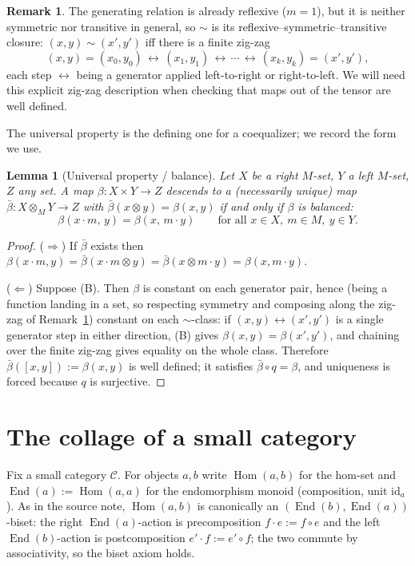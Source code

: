 \documentclass[11pt]{article}
\newtheorem{lemma}[theorem]{Lemma}
\theoremstyle{definition}
\newtheorem{remark}[theorem]{Remark}
\newcommand{\Hom}{\operatorname{Hom}}
\newcommand{\End}{\operatorname{End}}
\newcommand{\id}{\mathrm{id}}
\newcommand{\C}{\mathcal{C}}
\begin{document}
\begin{remark}\label{rem:relation}
The generating relation is already reflexive ($m=1$), but it is neither
symmetric nor transitive in general, so $\sim$ is its
reflexive--symmetric--transitive closure: $(x,y)\sim(x',y')$ iff there is a
finite zig-zag
\[
  (x,y) = (x_0,y_0) \,\leftrightarrow\, (x_1,y_1)
  \,\leftrightarrow\, \cdots \,\leftrightarrow\, (x_k,y_k) = (x',y'),
\]
each step $\leftrightarrow$ being a generator applied left-to-right or
right-to-left. We will need this explicit zig-zag description when checking
that maps out of the tensor are well defined.
\end{remark}

The universal property is the defining one for a coequalizer; we record the
form we use.

\begin{lemma}[Universal property / balance]\label{lem:up}
Let $X$ be a right $M$-set, $Y$ a left $M$-set, $Z$ any set. A map
$\beta:X\times Y\to Z$ \emph{descends} to a (necessarily unique) map
$\bar\beta:X\otimes_M Y\to Z$ with $\bar\beta(x\otimes y)=\beta(x,y)$ if and
only if $\beta$ is \emph{balanced}:
\[
  \beta(x\cdot m,\, y) = \beta(x,\, m\cdot y)
  \qquad\text{for all } x\in X,\ m\in M,\ y\in Y. \tag{B}
\]
\end{lemma}

\begin{proof}
($\Rightarrow$) If $\bar\beta$ exists then
$\beta(x\cdot m,y)=\bar\beta(x\cdot m\otimes y)
=\bar\beta(x\otimes m\cdot y)=\beta(x,m\cdot y)$.

($\Leftarrow$) Suppose (B). Then $\beta$ is constant on each generator pair,
hence (being a function landing in a set, so respecting symmetry and
composing along the zig-zag of Remark~\ref{rem:relation}) constant on each
$\sim$-class: if $(x,y)\leftrightarrow(x',y')$ is a single generator step in
either direction, (B) gives $\beta(x,y)=\beta(x',y')$, and chaining over the
finite zig-zag gives equality on the whole class. Therefore
$\bar\beta([x,y]):=\beta(x,y)$ is well defined; it satisfies
$\bar\beta\circ q=\beta$, and uniqueness is forced because $q$ is surjective.
\end{proof}

\section{The collage of a small category}

Fix a small category $\C$. For objects $a,b$ write $\Hom(a,b)$ for the
hom-set and $\End(a):=\Hom(a,a)$ for the endomorphism monoid (composition,
unit $\id_a$). As in the source note, $\Hom(a,b)$ is canonically an
$(\End(b),\End(a))$-biset: the right $\End(a)$-action is precomposition
$f\cdot e := f\circ e$ and the left $\End(b)$-action is postcomposition
$e'\cdot f := e'\circ f$; the two commute by associativity, so the biset
axiom holds.
\end{document}

